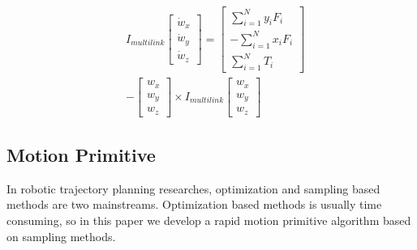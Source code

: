 \documentclass{jarticle}
\begin{document}
\begin{eqnarray}
  \label{eq:model2-0}
  & I_{multilink} \left[ \begin{array}{c}
      \dot{w} _x \\
      \dot{w} _y \\
      \dot{w} _z
    \end{array}\right]
  = \left[ \begin{array}{c}
      \sum_{i=1}^{N} y_i F_i \\
      -\sum_{i=1}^{N} x_i F_i \\
      \sum_{i=1}^{N} T_i
    \end{array}\right] \nonumber \\
  \label{eq:model2}
  & - \left[ \begin{array}{c}
      w_x \\
      w_y \\
      w_z
    \end{array}\right]
  \times I_{multilink} \left[ \begin{array}{c}
      w_x \\
      w_y \\
      w_z
    \end{array}\right]
\end{eqnarray}

  




\subsection{Motion Primitive}
In robotic trajectory planning researches, optimization and sampling based methods are two mainstreams. Optimization based methods is usually time consuming, so in this paper we develop a rapid motion primitive algorithm based on sampling methods.
\end{document}
